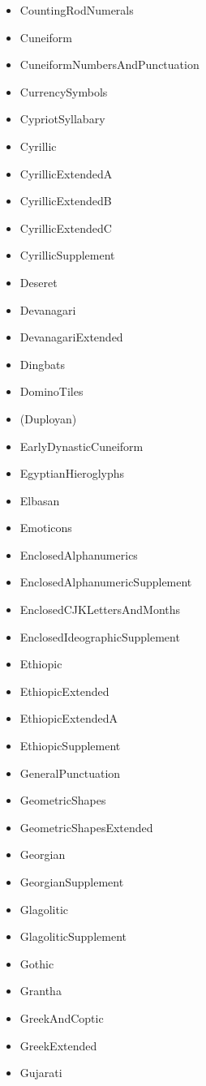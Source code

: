 ﻿\documentclass{article}
\newenvironment{itemlist}{%
  \begin{itemize}
	\setlength{\itemsep}{0pt}
	\setlength{\parsep}{0pt}
	\setlength{\topsep}{0pt}
	\setlength{\partopsep}{0pt}
	\setlength{\parskip}{0pt}
	\setlength{\labelsep}{5pt}}%
{
  \end{itemize}}
\begin{document}
\begin{multicols}{2}
\begin{itemlist}
				\item CountingRodNumerals
				\item Cuneiform
				\item CuneiformNumbersAndPunctuation
				\item CurrencySymbols
				\item CypriotSyllabary
				\item Cyrillic
				\item CyrillicExtendedA
				\item CyrillicExtendedB
				\item CyrillicExtendedC
				\item CyrillicSupplement
				\item Deseret
				\item Devanagari
				\item DevanagariExtended
				\item Dingbats
				\item DominoTiles
				\item (Duployan)
				\item EarlyDynasticCuneiform
				\item EgyptianHieroglyphs
				\item Elbasan
				\item Emoticons
				\item EnclosedAlphanumerics
				\item EnclosedAlphanumericSupplement
				\item EnclosedCJKLettersAndMonths
				\item EnclosedIdeographicSupplement
				\item Ethiopic
				\item EthiopicExtended
				\item EthiopicExtendedA
				\item EthiopicSupplement
				\item GeneralPunctuation
				\item GeometricShapes
				\item GeometricShapesExtended
				\item Georgian
				\item GeorgianSupplement
				\item Glagolitic
				\item GlagoliticSupplement
				\item Gothic
				\item Grantha
				\item GreekAndCoptic
				\item GreekExtended
				\item Gujarati

\end{itemlist}
\end{multicols}
\end{document}
